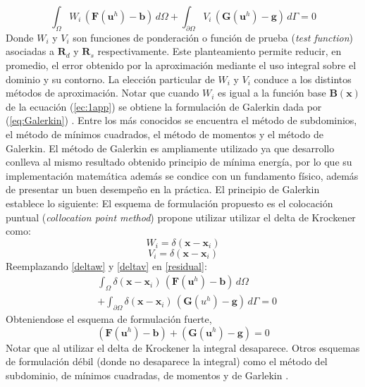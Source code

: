 \begin{equation} \label{eq:residuos_ponderados_2}
\int_{\Omega} W_i \, ( \bm{F}(\bm{u}^h) - \bm{b} ) \, d\Omega + \int_{\partial \Omega} V_i \, ( \bm{G}(\bm{u}^h) - \bm{g} ) \, d\Gamma = 0 
 \end{equation}
Donde $W_i$ y $V_i$ son funciones de ponderación o función de prueba (\textit{test function}) asociadas a $\bm{R}_d$ y $\bm{R}_s$ respectivamente. Este planteamiento permite reducir, en promedio, el error obtenido por la aproximación mediante el uso integral sobre el dominio y su contorno. La elección particular de $W_i$ y $V_i$ conduce a los distintos métodos de aproximación. Notar que cuando $W_i$ es igual a la función base $\bm{B}(\bm{x})$ de la ecuación (\ref{ec:1app}) se obtiene la formulación de Galerkin dada por (\ref{eq:Galerkin}) . Entre los más conocidos se encuentra el método de subdominios, el método de mínimos cuadrados, el método de momentos y el método de Galerkin. El método de Galerkin es ampliamente utilizado ya que desarrollo conlleva al mismo resultado obtenido principio de mínima energía, por lo que su implementación matemática además se condice con un fundamento físico, además de presentar un buen desempeño en la práctica. El principio de Galerkin establece lo siguiente:
El esquema de formulación propuesto es el colocación puntual (\textit{collocation point method}) \cite{liuintro} \cite{marchant} propone utilizar utilizar el delta de Krockener como:
\begin{equation} \label{deltaw} W_i = \delta(\bm{x}-\bm{x}_i) \end{equation}
\begin{equation} \label{deltav} V_i = \delta(\bm{x}-\bm{x}_i) \end{equation}
Reemplazando \ref{deltaw} y \ref{deltav} en \ref{residual}:
\begin{equation} 
\begin{split}
& \int_{\Omega} \delta(\bm{x}-\bm{x}_i) \, ( \bm{F}(\bm{u}^h) - \bm{b} ) \, d\Omega \\
& + \int_{\partial \Omega} \delta(\bm{x}-\bm{x}_i) \, ( \bm{G}(u^h) - \bm{g} ) \, d\Gamma = 0
\end{split} 
\end{equation}
Obteniendose el esquema de formulación fuerte,
\begin{equation}
 ( \bm{F}(\bm{u}^h) - \bm{b} ) + ( \bm{G}(\bm{u}^h) - \bm{g} ) = 0 
 \end{equation}
Notar que al utilizar el delta de Krockener la integral desaparece. Otros esquemas de formulación débil (donde no desaparece la integral) como el método del subdominio, de mínimos cuadradas, de momentos y de Garlekin \cite{liuintro}.

